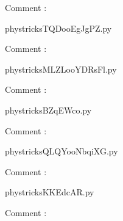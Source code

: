     Comment : 

    \clearpage
    


    \newcommand{\CaptionFigTQDooEgJgPZ}{<+Type your caption here+>}
    \begin{center}
        
    \end{center}
    phystricksTQDooEgJgPZ.py

    Comment : 

    \clearpage
    


    \newcommand{\CaptionFigMLZLooYDRsFl}{<+Type your caption here+>}
    \begin{center}
        
    \end{center}
    phystricksMLZLooYDRsFl.py

    Comment : 

    \clearpage
    


    \newcommand{\CaptionFigBZqEWco}{<+Type your caption here+>}
    \begin{center}
        
    \end{center}
    phystricksBZqEWco.py

    Comment : 

    \clearpage
    


    \newcommand{\CaptionFigQLQYooNbqiXG}{<+Type your caption here+>}
    \begin{center}
        
    \end{center}
    phystricksQLQYooNbqiXG.py

    Comment : 

    \clearpage
    


    \newcommand{\CaptionFigKKEdcAR}{<+Type your caption here+>}
    \begin{center}
        
    \end{center}
    phystricksKKEdcAR.py

    Comment : 

    \clearpage
    


